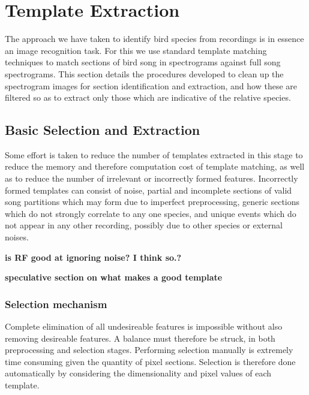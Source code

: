 \section{Template Extraction}
The approach we have taken to identify bird species from recordings is in
essence an image recognition task.
For this we use standard template matching techniques to match sections of
bird song in spectrograms against full song spectrograms.
This section details the procedures developed to clean up the spectrogram images
for section identification and extraction, and how these are filtered so as to
extract only those which are indicative of the relative species.




\subsection{Basic Selection and Extraction}\label{sec:template_select}
Some effort is taken to reduce the number of templates extracted in this stage
to reduce the memory and therefore computation cost of template matching, as well
as to reduce the number of irrelevant or incorrectly formed features.
Incorrectly formed templates can consist of noise, partial and incomplete
sections of valid song partitions which may form due to imperfect preprocessing,
generic sections which do not strongly correlate to any one species,
and unique events which do not appear in any other recording, possibly due to
other species or external noises.

\textbf{is RF good at ignoring noise? I think so.?}

\textbf{speculative section on what makes a good template}

\subsubsection{Selection mechanism}
Complete elimination of all undesireable features is impossible without also
removing desireable features.
A balance must therefore be struck, in both preprocessing and selection stages.
Performing selection manually is extremely time consuming given the quantity
of pixel sections.
Selection is therefore done automatically by considering the dimensionality and
pixel values of each template.\\


